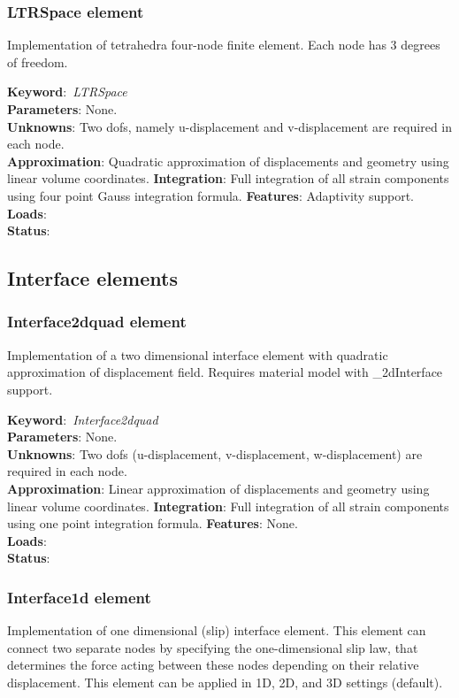\documentclass[12pt,dvips]{article}
\newcommand{\descitem}[1]{{\noindent \bf #1}:}
\newcommand{\elemkeyword}[1]{\descitem{Keyword}~{\em #1}}
\begin{document}
\subsubsection{LTRSpace element}
Implementation of tetrahedra four-node finite element. 
Each node has 3 degrees of freedom. 

\elemkeyword{LTRSpace}\\
\descitem{Parameters} None.\\
\descitem{Unknowns}
Two dofs, namely u-displacement and v-displacement are required in each node.\\
\descitem{Approximation} Quadratic approximation of displacements and
geometry using linear volume coordinates.
\descitem{Integration}
Full integration of all strain components using four point Gauss integration formula.
\descitem{Features} Adaptivity support.\\
\descitem{Loads} \\
\descitem{Status} 

\subsection{Interface elements}
\subsubsection{Interface2dquad element}
Implementation of a two dimensional interface element with quadratic
approximation of displacement field. Requires material model with
\_2dInterface support.

\elemkeyword{Interface2dquad}\\
\descitem{Parameters} None.\\
\descitem{Unknowns}
Two dofs (u-displacement, v-displacement, w-displacement) are required in each node.\\
\descitem{Approximation} Linear approximation of displacements and
geometry using linear volume coordinates.
\descitem{Integration}
Full integration of all strain components using one point integration formula.
\descitem{Features} None.\\
\descitem{Loads} \\
\descitem{Status} 


\subsubsection{Interface1d element}
Implementation of one dimensional (slip) interface element. 
This element can connect two separate nodes by specifying the
one-dimensional slip law, that determines the force acting between
these nodes depending on their relative displacement. This element can
be applied in 1D, 2D, and 3D settings (default).
\end{document}

